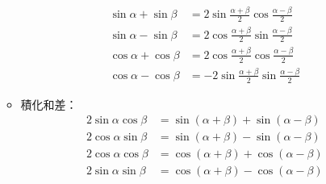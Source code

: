 \begin{enumerate}
\begin{itemize}
\begin{subequations}
\begin{align}
                \sin\alpha + \sin\beta & = 2\sin\frac{\alpha + \beta}{2}\cos\frac{\alpha - \beta}{2} \\
                \sin\alpha - \sin\beta & = 2\cos\frac{\alpha + \beta}{2}\sin\frac{\alpha - \beta}{2} \\
                \cos\alpha + \cos\beta & = 2\cos\frac{\alpha + \beta}{2}\cos\frac{\alpha - \beta}{2} \\
                \cos\alpha - \cos\beta & = -2\sin\frac{\alpha + \beta}{2}\sin\frac{\alpha - \beta}{2}
            \end{align}
        \end{subequations}
        \item 積化和差： \begin{subequations}
            \begin{align}
                2\sin\alpha\cos\beta & = \sin(\alpha + \beta) + \sin(\alpha - \beta) \\
                2\cos\alpha\sin\beta & = \sin(\alpha + \beta) - \sin(\alpha - \beta) \\
                2\cos\alpha\cos\beta & = \cos(\alpha + \beta) + \cos(\alpha - \beta) \\
                2\sin\alpha\sin\beta & = \cos(\alpha + \beta) - \cos(\alpha - \beta)
            \end{align}
        \end{subequations}
    \end{itemize}
\end{enumerate}

\pagebreak